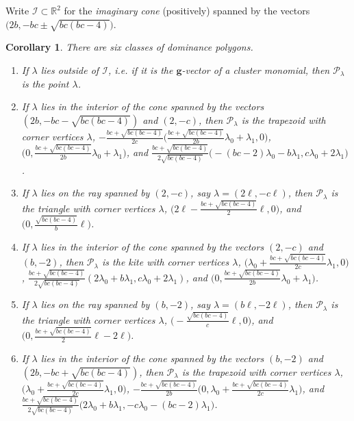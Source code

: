 \documentclass{amsart}
\newtheorem{corollary}[theorem]{Corollary}
\numberwithin{theorem}{section}
\newcommand{\bfg}{\boldsymbol{g}}
\newcommand{\cI}{\mathcal{I}}
\newcommand{\cP}{\mathcal{P}}
\newcommand{\RR}{\mathbb{R}}
\begin{document}
  Write $\cI \subset \RR^2$ for the \emph{imaginary cone} (positively) spanned by the vectors $\big(2b,-bc\pm\sqrt{bc(bc-4)}\big)$.
  \begin{corollary}
    \label{cor:dominance vertices}
    There are six classes of dominance polygons.
    \begin{enumerate}
      \item If $\lambda$ lies outside of $\cI$, i.e. if it is the $\bfg$-vector of a cluster monomial, then $\cP_\lambda$ is the point $\lambda$. 
      \item If $\lambda$ lies in the interior of the cone spanned by the vectors $(2b,-bc-\sqrt{bc(bc-4)})$ and $(2,-c)$, then $\cP_\lambda$ is the trapezoid with corner vertices $\lambda$, $-\frac{bc+\sqrt{bc(bc-4)}}{2c}\big(\frac{bc+\sqrt{bc(bc-4)}}{2b}\lambda_0+\lambda_1,0\big)$, $\big(0,\frac{bc+\sqrt{bc(bc-4)}}{2b}\lambda_0+\lambda_1\big)$, and $\frac{bc+\sqrt{bc(bc-4)}}{2\sqrt{bc(bc-4)}}\big(-(bc-2)\lambda_0-b\lambda_1,c\lambda_0+2\lambda_1\big)$.
      \item If $\lambda$ lies on the ray spanned by $(2,-c)$, say $\lambda=(2\ell,-c\ell)$, then $\cP_\lambda$ is the triangle with corner vertices $\lambda$, $\big(2\ell-\frac{bc+\sqrt{bc(bc-4)}}{2}\ell,0\big)$, and $\big(0,\frac{\sqrt{bc(bc-4)}}{b}\ell\big)$.
      \item If $\lambda$ lies in the interior of the cone spanned by the vectors $(2,-c)$ and $(b,-2)$, then $\cP_\lambda$ is the kite with corner vertices $\lambda$, $\big(\lambda_0+\frac{bc+\sqrt{bc(bc-4)}}{2c}\lambda_1,0\big)$, $\frac{bc+\sqrt{bc(bc-4)}}{2\sqrt{bc(bc-4)}}(2\lambda_0+b\lambda_1,c\lambda_0+2\lambda_1)$, and $\big(0,\frac{bc+\sqrt{bc(bc-4)}}{2b}\lambda_0+\lambda_1\big)$.
      \item If $\lambda$ lies on the ray spanned by $(b,-2)$, say $\lambda=(b\ell,-2\ell)$, then $\cP_\lambda$ is the triangle with corner vertices $\lambda$, $\big(-\frac{\sqrt{bc(bc-4)}}{c}\ell,0\big)$, and $\big(0,\frac{bc+\sqrt{bc(bc-4)}}{2}\ell-2\ell\big)$.
      \item If $\lambda$ lies in the interior of the cone spanned by the vectors $(b,-2)$ and $(2b,-bc+\sqrt{bc(bc-4)})$, then $\cP_\lambda$ is the trapezoid with corner vertices $\lambda$, $\big(\lambda_0+\frac{bc+\sqrt{bc(bc-4)}}{2c}\lambda_1,0\big)$, $-\frac{bc+\sqrt{bc(bc-4)}}{2b}\big(0,\lambda_0+\frac{bc+\sqrt{bc(bc-4)}}{2c}\lambda_1\big)$, and $\frac{bc+\sqrt{bc(bc-4)}}{2\sqrt{bc(bc-4)}}\big(2\lambda_0+b\lambda_1,-c\lambda_0-(bc-2)\lambda_1\big)$.
    \end{enumerate}
  \end{corollary}
\end{document}

